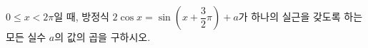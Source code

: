$0\le x<2\pi$일 때, 방정식 $2\cos x=\sin\left(x+\dfrac{3}{2}\pi\right)+a$가 하나의 실근을 갖도록 하는 모든 실수 $a$의 값의 곱을 구하시오.
